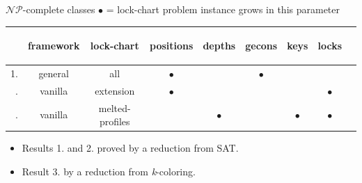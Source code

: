\begin{frame}{$\mathcal{NP}$-complete classes}
  $\bullet$ = lock-chart problem instance grows in this parameter

  \vfill
  \begin{tabular}{r|cc|ccc|ccl}
       & framework & lock-chart      & \begin{rotate}{60}positions\end{rotate} & \begin{rotate}{60}depths\end{rotate} & \begin{rotate}{60}gecons\end{rotate} & \begin{rotate}{60}keys\end{rotate} & \begin{rotate}{60}locks\end{rotate} &                  \\\hline
    1. & general   & all             & $\bullet$                               &                                      & $\bullet$                            &                                    &                                     &                  \\\pause
    2. & vanilla   & extension       & $\bullet$                               &                                      &                                      &                                    & $\bullet$                           & \cite{lawer2004} \\\pause
    3. & vanilla   & melted-profiles &                                         & $\bullet$                            &                                      & $\bullet$                          & $\bullet$                           &                  \\
  \end{tabular}

  \vfill
  \begin{itemize}
    \item Results 1. and 2. proved by a reduction from SAT.
    \item Result 3. by a reduction from \textit{k}-coloring.
  \end{itemize}
\end{frame}


